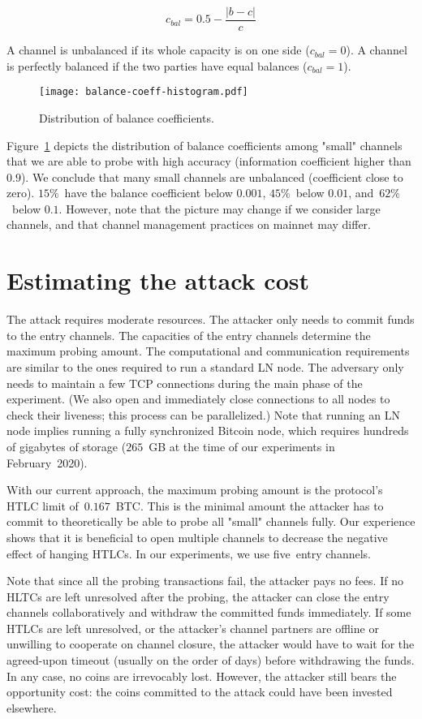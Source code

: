 \[c_{bal} = 0.5 - \frac{|b-c|}{c} \]

A channel is unbalanced if its whole capacity is on one side ($c_{bal} = 0$).
A channel is perfectly balanced if the two parties have equal balances ($c_{bal} = 1$).

\begin{figure}[h]
	\centering
	\texttt{[image: balance-coeff-histogram.pdf]}
	\caption{Distribution of balance coefficients.}
	\label{fig:balance-coeff-histogram}
\end{figure}

Figure~\ref{fig:balance-coeff-histogram} depicts the distribution of balance coefficients among "small" channels that we are able to probe with high accuracy (information coefficient higher than $0.9$).
We conclude that many small channels are unbalanced (coefficient close to zero).
$15\%$~have the balance coefficient below $0.001$, $45\%$~below $0.01$, and~$62\%$~below $0.1$.
However, note that the picture may change if we consider large channels, and that channel management practices on mainnet may differ.


\section{Estimating the attack cost}

The attack requires moderate resources.
The attacker only needs to commit funds to the entry channels.
The capacities of the entry channels determine the maximum probing amount.
The computational and communication requirements are similar to the ones required to run a standard LN node.
The adversary only needs to maintain a few TCP connections during the main phase of the experiment.
(We also open and immediately close connections to all nodes to check their liveness; this process can be parallelized.)
Note that running an LN node implies running a fully synchronized Bitcoin node, which requires hundreds of gigabytes of storage ($265$~GB at the time of our experiments in February~2020).

With our current approach, the maximum probing amount is the protocol's HTLC limit of~$0.167$~BTC\@.
This is the minimal amount the attacker has to commit to theoretically be able to probe all "small" channels fully.
Our experience shows that it is beneficial to open multiple channels to decrease the negative effect of hanging HTLCs.
In our experiments, we use five~entry channels.

Note that since all the probing transactions fail, the attacker pays no fees.
If no HLTCs are left unresolved after the probing, the attacker can close the entry channels collaboratively and withdraw the committed funds immediately.
If some HTLCs are left unresolved, or the attacker's channel partners are offline or unwilling to cooperate on channel closure, the attacker would have to wait for the agreed-upon timeout (usually on the order of days) before withdrawing the funds.
In any case, no coins are irrevocably lost.
However, the attacker still bears the opportunity cost: the coins committed to the attack could have been invested elsewhere.

